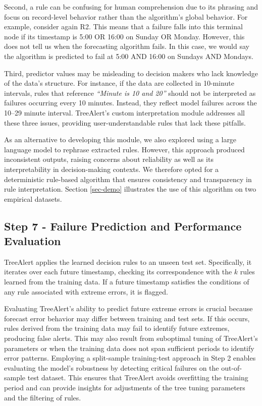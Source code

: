 \documentclass[ijds,sglanonrev]{informs4}
\begin{document}
Second, a rule can be confusing for human comprehension due to its phrasing and focus on record-level behavior rather than the algorithm’s global behavior. For example, consider again R2. This means that a failure falls into this terminal node if its timestamp is 5:00 OR 16:00 on Sunday OR Monday. However, this does not tell us when the forecasting algorithm fails. In this case, we would say the algorithm is predicted to fail at 5:00 AND 16:00 on Sundays AND Mondays. 

Third, predictor values may be misleading to decision makers who lack knowledge of the data’s structure. For instance, if the data are collected in 10-minute intervals, rules that reference  \textit{``Minute is 10 and 20”} should not be interpreted as failures occurring every 10 minutes. Instead, they reflect model failures across the 10–29 minute interval. TreeAlert’s custom interpretation module addresses all these three issues, providing user-understandable rules that lack these pitfalls.

As an alternative to developing this module, we also explored using a large language model to rephrase extracted rules. However, this approach produced inconsistent outputs, raising concerns about reliability as well as its interpretability in decision-making contexts. We therefore opted for a deterministic rule-based algorithm that ensures consistency and transparency in rule interpretation. Section \ref{sec-demo} illustrates the use of this algorithm on two empirical datasets.

\subsection{Step 7 - Failure Prediction and Performance Evaluation}

TreeAlert applies the learned decision rules to an unseen test set. Specifically, it iterates over each future timestamp, checking its correspondence with the $k$ rules learned from the training data. If a future timestamp satisfies the conditions of any rule associated with extreme errors, it is flagged.

Evaluating TreeAlert’s ability to predict future extreme errors is crucial because forecast error behavior may differ between training and test sets. If this occurs, rules derived from the training data may fail to identify future extremes, producing false alerts. This may also result from suboptimal tuning of TreeAlert’s parameters or when the training data does not span sufficient periods to identify error patterns. Employing a split-sample training-test approach in Step 2 enables evaluating the model’s robustness by detecting critical failures on the out-of-sample test dataset. This ensures that TreeAlert avoids overfitting the training period and can provide insights for adjustments of the tree tuning parameters and the filtering of rules. 
\end{document}
